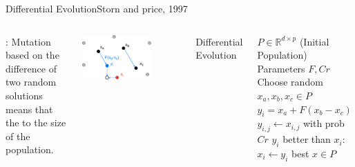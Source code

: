 \documentclass[aspectratio=169]{beamer}
\begin{document}
\begin{frame}{Differential Evolution}{Storn and price, 1997}
  \begin{columns}
    : Mutation based on the difference of two random solutions means that the  to the size of the population.

    \begin{center}
      \includegraphics[width=0.7\textwidth]{img/DiffEvo.png}
    \end{center}

      Differential Evolution\bigskip

      \begin{algorithmic}[1]
        \Require $P \in \mathbb{R}^{d\times p}$ (Initial Population)
        \Require Parameters $F, Cr$
          \State Choose random $x_a, x_b, x_c \in P$
          \State $y_i = x_a + F(x_b - x_c)$
          \State $y_{i,j} \gets x_{i,j}$ with prob $Cr$
          \EndFor
           $y_i$ better than $x_i$: $x_i \gets y_i$
          \EndFor
        \EndWhile
         best $x \in P$
      \end{algorithmic}
  \end{columns}
\end{frame}
\end{document}
